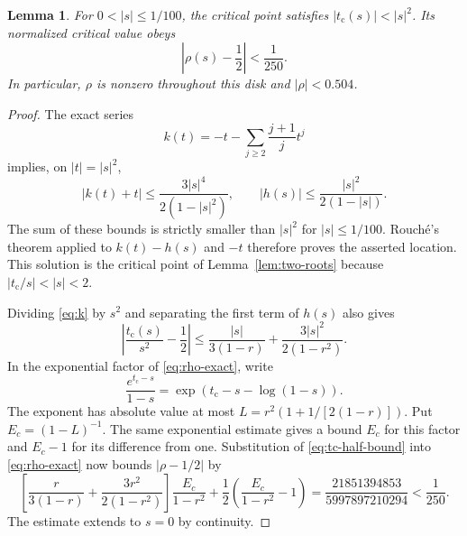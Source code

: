 \documentclass[11pt,a4paper]{article}
\newtheorem{lemma}[theorem]{Lemma}
\theoremstyle{definition}
\theoremstyle{remark}
\newcommand{\tc}{t_{\mathrm c}}
\begin{document}
\begin{lemma}\label{lem:rho-enclosure}
For $0<|s|\le1/100$, the critical point satisfies
$|\tc(s)|<|s|^2$. Its normalized critical value obeys
\begin{equation}\label{eq:rho-enclosure}
 \left|\rho(s)-\frac12\right|<\frac1{250}.
\end{equation}
In particular, $\rho$ is nonzero throughout this disk and $|\rho|<0.504$.
\end{lemma}
\begin{proof}
The exact series
\[
 k(t)=-t-\sum_{j\ge2}\frac{j+1}{j}t^j
\]
implies, on $|t|=|s|^2$,
\[
 |k(t)+t|\le\frac{3|s|^4}{2(1-|s|^2)},\qquad
 |h(s)|\le\frac{|s|^2}{2(1-|s|)}.
\]
The sum of these bounds is strictly smaller than $|s|^2$ for
$|s|\le1/100$. Rouch\'e's theorem applied to $k(t)-h(s)$ and $-t$
therefore proves the asserted location. This solution is the critical
point of Lemma~\ref{lem:two-roots} because $|\tc/s|<|s|<2$.

Dividing \eqref{eq:k} by $s^2$ and separating the first term of $h(s)$
also gives
\begin{equation}\label{eq:tc-half-bound}
 \left|\frac{\tc(s)}{s^2}-\frac12\right|
 \le\frac{|s|}{3(1-r)}+\frac{3|s|^2}{2(1-r^2)}.
\end{equation}
In the exponential factor of \eqref{eq:rho-exact}, write
\[
 \frac{e^{\tc-s}}{1-s}=\exp(\tc-s-\log(1-s)).
\]
The exponent has absolute value at most
$L=r^2(1+1/[2(1-r)])$. Put $E_c=(1-L)^{-1}$. The same exponential
estimate gives a bound $E_c$ for this factor and $E_c-1$ for its
difference from one. Substitution of \eqref{eq:tc-half-bound} into
\eqref{eq:rho-exact} now bounds $|\rho-1/2|$ by
\[
 \left[\frac r{3(1-r)}+\frac{3r^2}{2(1-r^2)}\right]
       \frac{E_c}{1-r^2}
 +\frac12\left(\frac{E_c}{1-r^2}-1\right)
 =\frac{21851394853}{5997897210294}<\frac1{250}.
\]
The estimate extends to $s=0$ by continuity.
\end{proof}
\end{document}
